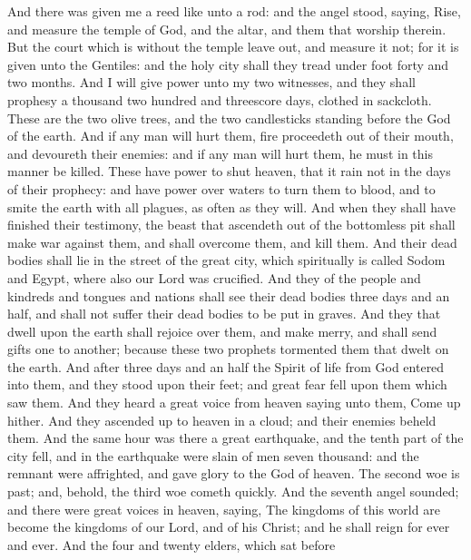  And there was given me a reed like unto a rod: and the
angel stood, saying, Rise, and measure the temple of God, and the altar,
and them that worship therein.  But the court which is
without the temple leave out, and measure it not; for it is given unto
the Gentiles: and the holy city shall they tread under foot forty and
two months.  And I will give power unto my two witnesses,
and they shall prophesy a thousand two hundred and threescore days,
clothed in sackcloth.  These are the two olive trees, and
the two candlesticks standing before the God of the earth.
 And if any man will hurt them, fire proceedeth out of
their mouth, and devoureth their enemies: and if any man will hurt them,
he must in this manner be killed.  These have power to
shut heaven, that it rain not in the days of their prophecy: and have
power over waters to turn them to blood, and to smite the earth with all
plagues, as often as they will.  And when they shall have
finished their testimony, the beast that ascendeth out of the bottomless
pit shall make war against them, and shall overcome them, and kill them.
 And their dead bodies shall lie in the street of the
great city, which spiritually is called Sodom and Egypt, where also our
Lord was crucified.  And they of the people and kindreds
and tongues and nations shall see their dead bodies three days and an
half, and shall not suffer their dead bodies to be put in graves.
 And they that dwell upon the earth shall rejoice over
them, and make merry, and shall send gifts one to another; because these
two prophets tormented them that dwelt on the earth.  And
after three days and an half the Spirit of life from God entered into
them, and they stood upon their feet; and great fear fell upon them
which saw them.  And they heard a great voice from heaven
saying unto them, Come up hither. And they ascended up to heaven in a
cloud; and their enemies beheld them.  And the same hour
was there a great earthquake, and the tenth part of the city fell, and
in the earthquake were slain of men seven thousand: and the remnant were
affrighted, and gave glory to the God of heaven.  The
second woe is past; and, behold, the third woe cometh quickly.
 And the seventh angel sounded; and there were great
voices in heaven, saying, The kingdoms of this world are become the
kingdoms of our Lord, and of his Christ; and he shall reign for ever and
ever.  And the four and twenty elders, which sat before
